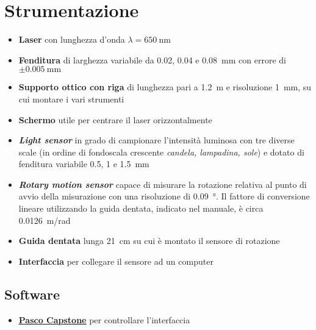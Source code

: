 \documentclass[../main.tex]{subfiles}
\begin{document}
\section{Strumentazione}

\begin{itemize}
    \item \textbf{Laser} con lunghezza d'onda $\lambda = \qty{650}{\nano\meter}$
    \item \textbf{Fenditura} di larghezza variabile da \num{0.02}, \num{0.04} e \qty{0.08}{\milli\meter} con errore di $\pm \qty{0.005}{\milli\meter}$
    \item \textbf{Supporto ottico con riga} di lunghezza pari a \qty{1.2}{\meter} e risoluzione \qty{1}{\milli\meter}, su cui montare i vari strumenti
    \item \textbf{Schermo} utile per centrare il laser orizzontalmente
    \item \textbf{\textit{Light sensor}} in grado di campionare l'intensità luminosa con tre diverse scale (in ordine di fondoscala crescente \textit{candela, lampadina, sole}) e dotato di fenditura variabile \num{0.5}, \num{1} e \qty{1.5}{\milli\meter}
    \item \textbf{\textit{Rotary motion sensor}} capace di misurare la rotazione relativa al punto di avvio della misurazione con una risoluzione di \qty{0.09}{\degree}. Il fattore di conversione lineare utilizzando la guida dentata, indicato nel manuale, è circa \qty{0.0126}{\meter/\radian}
    \item \textbf{Guida dentata} lunga \qty{21}{\centi\meter} su cui è montato il sensore di rotazione
    \item \textbf{Interfaccia} per collegare il sensore ad un computer
\end{itemize}

\subsection{Software}

\begin{itemize}
    \item \textbf{\href{https://www.pasco.com/downloads/capstone}{\underline{Pasco Capstone}}} per controllare l'interfaccia
\end{itemize}
\end{document}
